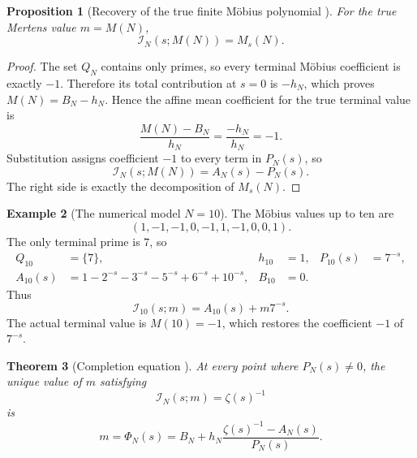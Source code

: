 \documentclass[11pt]{amsart}
\numberwithin{equation}{section}
\theoremstyle{plain}
\newtheorem{theorem}{Theorem}[section]
\newtheorem{proposition}[theorem]{Proposition}
\theoremstyle{definition}
\newtheorem{example}[theorem]{Example}
\theoremstyle{remark}
\newcommand{\1}{\mathbf{1}}
\begin{document}
\begin{proposition}[Recovery of the true finite Möbius polynomial {}]
\label{prop:true_terminal_value}
For the true Mertens value \(m=M(N)\),
\begin{equation}
\mathcal I_N(s;M(N))
=
M_s(N).
\label{eq:true_terminal_interpolation}
\end{equation}
\end{proposition}

\begin{proof}
The set \(Q_N\) contains only primes, so every terminal Möbius coefficient
is exactly \(-1\).  Therefore its total contribution at \(s=0\) is
\(-h_N\), which proves \(M(N)=B_N-h_N\).  Hence the affine mean coefficient
for the true terminal value is
\begin{equation}
\frac{M(N)-B_N}{h_N}
=
\frac{-h_N}{h_N}
=-1.
\label{eq:true_terminal_mean_proof_detailed}
\end{equation}
Substitution assigns coefficient \(-1\) to every term in \(P_N(s)\), so
\begin{equation}
\mathcal I_N(s;M(N))
=
A_N(s)-P_N(s).
\label{eq:true_terminal_interpolation_proof_detailed}
\end{equation}
The right side is exactly the decomposition of \(M_s(N)\).
\end{proof}

\begin{example}[The numerical model \(N=10\)]
\label{ex:N10_affine_interpolation}
The Möbius values up to ten are
\begin{equation}
(1,-1,-1,0,-1,1,-1,0,0,1).
\label{eq:N10_mobius_vector}
\end{equation}
The only terminal prime is \(7\), so
\begin{align}
Q_{10}&=\{7\},
&h_{10}&=1,
&P_{10}(s)&=7^{-s},
\label{eq:N10_terminal_data_detailed}
\\
A_{10}(s)
&=
1-2^{-s}-3^{-s}-5^{-s}+6^{-s}+10^{-s},
&B_{10}&=0.
\label{eq:N10_A_B_detailed}
\end{align}
Thus
\begin{equation}
\mathcal I_{10}(s;m)
=
A_{10}(s)+m7^{-s}.
\label{eq:N10_interpolation_detailed}
\end{equation}
The actual terminal value is \(M(10)=-1\), which restores the coefficient
\(-1\) of \(7^{-s}\).
\end{example}


\begin{theorem}[Completion equation {}]
\label{thm:completion_equation}
At every point where \(P_N(s)\neq0\), the unique value of \(m\) satisfying
\begin{equation}
\mathcal I_N(s;m)=\zeta(s)^{-1}
\label{eq:completion_equation}
\end{equation}
is
\begin{equation}
\boxed{
 m=\Phi_N(s)
 =
 B_N+h_N\frac{\zeta(s)^{-1}-A_N(s)}{P_N(s)}.
}
\label{eq:completion_solution}
\end{equation}
\end{theorem}
\end{document}
